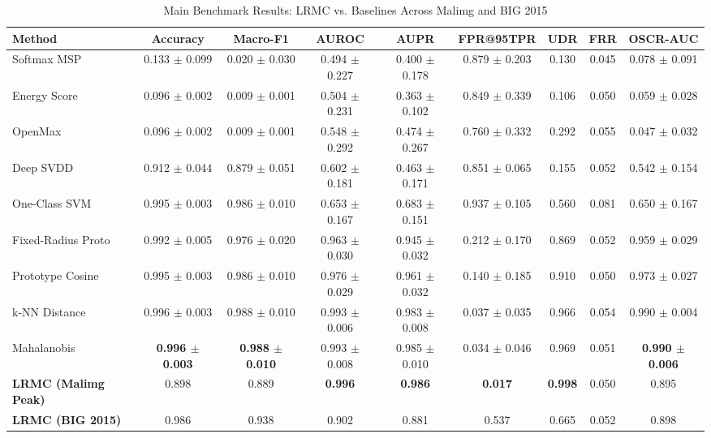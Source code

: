 \documentclass[conference]{IEEEtran}
\begin{document}
\begin{table}[t]
\centering
\caption{Main Benchmark Results: LRMC vs. Baselines Across Malimg and BIG 2015}
\label{tab:main_results}
\begin{tabular}{lcccccccc}
\toprule
Method & Accuracy & Macro-F1 & AUROC & AUPR & FPR@95TPR & UDR & FRR & OSCR-AUC \\
\midrule
Softmax MSP \cite{bendale2016} & 0.133 $\pm$ 0.099 & 0.020 $\pm$ 0.030 & 0.494 $\pm$ 0.227 & 0.400 $\pm$ 0.178 & 0.879 $\pm$ 0.203 & 0.130 & 0.045 & 0.078 $\pm$ 0.091 \\
Energy Score \cite{liu2020energy} & 0.096 $\pm$ 0.002 & 0.009 $\pm$ 0.001 & 0.504 $\pm$ 0.231 & 0.363 $\pm$ 0.102 & 0.849 $\pm$ 0.339 & 0.106 & 0.050 & 0.059 $\pm$ 0.028 \\
OpenMax \cite{bendale2016} & 0.096 $\pm$ 0.002 & 0.009 $\pm$ 0.001 & 0.548 $\pm$ 0.292 & 0.474 $\pm$ 0.267 & 0.760 $\pm$ 0.332 & 0.292 & 0.055 & 0.047 $\pm$ 0.032 \\
Deep SVDD \cite{ruff2018} & 0.912 $\pm$ 0.044 & 0.879 $\pm$ 0.051 & 0.602 $\pm$ 0.181 & 0.463 $\pm$ 0.171 & 0.851 $\pm$ 0.065 & 0.155 & 0.052 & 0.542 $\pm$ 0.154 \\
One-Class SVM \cite{scholkopf2001} & 0.995 $\pm$ 0.003 & 0.986 $\pm$ 0.010 & 0.653 $\pm$ 0.167 & 0.683 $\pm$ 0.151 & 0.937 $\pm$ 0.105 & 0.560 & 0.081 & 0.650 $\pm$ 0.167 \\
Fixed-Radius Proto & 0.992 $\pm$ 0.005 & 0.976 $\pm$ 0.020 & 0.963 $\pm$ 0.030 & 0.945 $\pm$ 0.032 & 0.212 $\pm$ 0.170 & 0.869 & 0.052 & 0.959 $\pm$ 0.029 \\
Prototype Cosine & 0.995 $\pm$ 0.003 & 0.986 $\pm$ 0.010 & 0.976 $\pm$ 0.029 & 0.961 $\pm$ 0.032 & 0.140 $\pm$ 0.185 & 0.910 & 0.050 & 0.973 $\pm$ 0.027 \\
k-NN Distance & 0.996 $\pm$ 0.003 & 0.988 $\pm$ 0.010 & 0.993 $\pm$ 0.006 & 0.983 $\pm$ 0.008 & 0.037 $\pm$ 0.035 & 0.966 & 0.054 & 0.990 $\pm$ 0.004 \\
Mahalanobis \cite{lee2018simple} & \textbf{0.996 $\pm$ 0.003} & \textbf{0.988 $\pm$ 0.010} & 0.993 $\pm$ 0.008 & 0.985 $\pm$ 0.010 & 0.034 $\pm$ 0.046 & 0.969 & 0.051 & \textbf{0.990 $\pm$ 0.006} \\
\midrule
\textbf{LRMC (Malimg Peak)} & 0.898 & 0.889 & \textbf{0.996} & \textbf{0.986} & \textbf{0.017} & \textbf{0.998} & 0.050 & 0.895 \\
\textbf{LRMC (BIG 2015)} & 0.986 & 0.938 & 0.902 & 0.881 & 0.537 & 0.665 & 0.052 & 0.898 \\
\bottomrule
\end{tabular}
\end{table}
\end{document}
